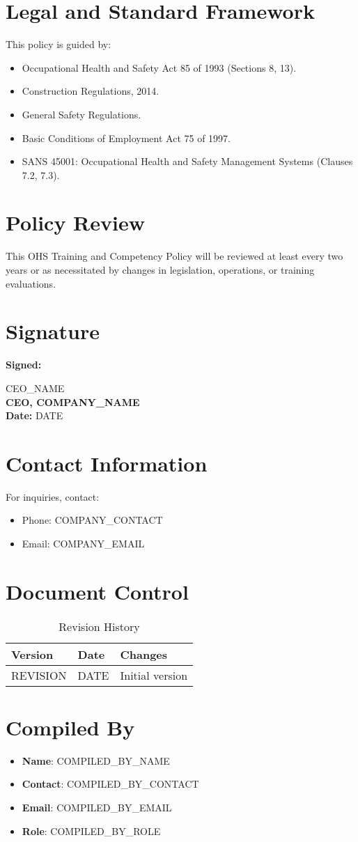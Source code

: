 \documentclass[12pt]{article}
\begin{document}
\section{Legal and Standard Framework}
This policy is guided by:
\begin{itemize}
    \item Occupational Health and Safety Act 85 of 1993 (Sections 8, 13).
    \item Construction Regulations, 2014.
    \item General Safety Regulations.
    \item Basic Conditions of Employment Act 75 of 1997.
    \item SANS 45001: Occupational Health and Safety Management Systems (Clauses 7.2, 7.3).
\end{itemize}

\section{Policy Review}
This OHS Training and Competency Policy will be reviewed at least every two years or as necessitated by changes in legislation, operations, or training evaluations.

\section{Signature}
\textbf{Signed:}

{{CEO_NAME}}\\
\textbf{CEO, {{COMPANY_NAME}}}\\
\textbf{Date:} {{DATE}}

\section{Contact Information}
For inquiries, contact:
\begin{itemize}
    \item Phone: {{COMPANY_CONTACT}}
    \item Email: {{COMPANY_EMAIL}}
\end{itemize}

\section{Document Control}
\begin{table}[h]
    \centering
    \begin{tabular}{p{3cm}p{3cm}p{6cm}}
        \toprule
        \textbf{Version} & \textbf{Date} & \textbf{Changes} \\
        \midrule
        {{REVISION}} & {{DATE}} & Initial version \\
        \bottomrule
    \end{tabular}
    \caption{Revision History}
\end{table}

\section{Compiled By}
\begin{itemize}
    \item \textbf{Name}: {{COMPILED_BY_NAME}}
    \item \textbf{Contact}: {{COMPILED_BY_CONTACT}}
    \item \textbf{Email}: {{COMPILED_BY_EMAIL}}
    \item \textbf{Role}: {{COMPILED_BY_ROLE}}
\end{itemize}
\end{document}
